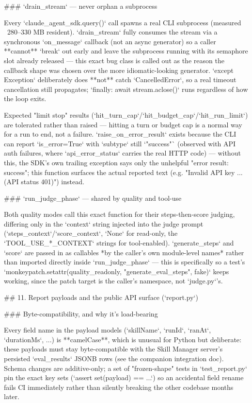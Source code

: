 ### `drain_stream` — never orphan a subprocess

Every `claude_agent_sdk.query()` call spawns a real CLI subprocess (measured ~280–330 MB resident). `drain_stream` fully consumes the stream via a synchronous `on_message` callback (not an async generator) so a caller **cannot** `break` out early and leave the subprocess running with its semaphore slot already released — this exact bug class is called out as the reason the callback shape was chosen over the more idiomatic-looking generator. `except Exception` deliberately does **not** catch `CancelledError`, so a real timeout cancellation still propagates; `finally: await stream.aclose()` runs regardless of how the loop exits.

Expected "limit stop" results (`hit_turn_cap`/`hit_budget_cap`/`hit_run_limit`) are tolerated rather than raised — hitting a turn or budget cap is a normal way for a run to end, not a failure. `raise_on_error_result` exists because the CLI can report `is_error=True` with `subtype` still `"success"` (observed with API auth failures, where `api_error_status` carries the real HTTP code) — without this, the SDK's own trailing exception says only the unhelpful "error result: success"; this function surfaces the actual reported text (e.g. "Invalid API key ... (API status 401)") instead.

### `run_judge_phase` — shared by quality and tool-use

Both quality modes call this exact function for their steps-then-score judging, differing only in the `context` string injected into the judge prompt (`steps_context`/`score_context`, `None` for read-only, the `TOOL_USE_*_CONTEXT` strings for tool-enabled). `generate_steps` and `score` are passed in as callables *by the caller's own module-level names* rather than imported directly inside `run_judge_phase` — this is specifically so a test's `monkeypatch.setattr(quality_readonly, "generate_eval_steps", fake)` keeps working, since the patch target is the caller's namespace, not `judge.py`'s.

## 11. Report payloads and the public API surface (`report.py`)

### Byte-compatibility, and why it's load-bearing

Every field name in the payload models (`skillName`, `runId`, `ranAt`, `durationMs`, ...) is **camelCase**, which is unusual for Python but deliberate: these payloads must stay byte-compatible with the Skill Manager server's persisted `eval_results` JSONB rows (see the companion integration doc). Schema changes are additive-only; a set of "frozen-shape" tests in `test_report.py` pin the exact key sets (`assert set(payload) == {...}`) so an accidental field rename fails CI immediately rather than silently breaking the other codebase months later.

